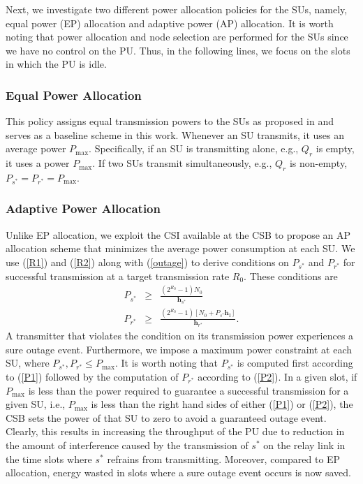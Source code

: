 \documentclass[journal,twocolumn]{IEEEtran}
\begin{document}
Next, we investigate two different power allocation policies for the SUs, namely, equal power (EP) allocation and adaptive power (AP) allocation. It is worth noting that power allocation and node selection are performed for the SUs since we have no control on the PU. 
Thus, in the following lines, we focus on the slots in which the PU is idle.

\subsubsection{Equal Power Allocation}\label{UP}
This policy assigns equal transmission powers to the SUs as proposed in \cite{Krikidis} and serves as a baseline scheme in this work. Whenever an SU transmits, it uses an average power $P_{\mathrm{max}}$. Specifically, if an SU is transmitting alone, e.g., $Q_{r}$ is empty, it uses a power $P_{\mathrm{max}}$. If two SUs transmit simultaneously, e.g., $Q_{r}$ is non-empty, $P_{s^*}=P_{r^*}=P_{\mathrm{max}}$.

\subsubsection{Adaptive Power Allocation}
\label{AP}
Unlike EP allocation, we exploit the CSI available at the CSB to propose an AP allocation scheme that minimizes the average power consumption
at each SU. We use (\ref{R1}) and (\ref{R2}) along with (\ref{outage}) to derive conditions on $P_{s^*}$ and $P_{r^*}$ for successful transmission at a target transmission rate $R_{0}$.
These conditions are
\begin{eqnarray}
P_{s^*} &\geq & \frac{(2^{R_{0}}-1)N_{0}}{\mathbf{h}_{s^*}} \label{P1} \\
P_{r^*} &\geq & \frac{(2^{R_{0}}-1)[N_{0}+ P_{s^*}\mathbf{h}_{\mathrm{I}}]}
{\mathbf{h}_{r^*}}. \label{P2}
\end{eqnarray}
A transmitter that violates the condition on its transmission power experiences a sure outage event. Furthermore, we impose a maximum power constraint at each SU, where $P_{s^*},P_{r^*} \leq P_{\mathrm{max}}$. It is worth noting that $P_{s^*}$ is computed first according to (\ref{P1}) followed by the computation of $P_{r^*}$ according to (\ref{P2}). In a given slot, if $P_{\mathrm{max}}$ is less
than the power required to guarantee a successful transmission for a given SU, i.e., $P_{\mathrm{max}}$ is less than the right hand sides of either (\ref{P1}) or (\ref{P2}), the CSB sets the power of that SU to zero to avoid a guaranteed outage event. Clearly, this results in increasing the throughput of the PU due to reduction in the amount of interference caused by the transmission of $s^*$ on the relay link in the time slots where $s^*$ refrains from transmitting. Moreover, compared to EP allocation, energy wasted in slots where a sure outage event occurs is now saved. 
\end{document}
